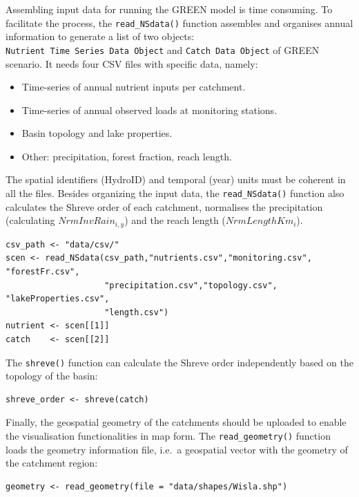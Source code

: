 Assembling input data for running the GREEN model is time consuming. To facilitate the process, the \texttt{read\_NSdata()} function assembles and organises annual information to generate a list of two objects: \texttt{Nutrient\ Time\ Series\ Data\ Object} and \texttt{Catch\ Data\ Object} of GREEN scenario. It needs four CSV files with specific data, namely:

\begin{itemize}
\item
  Time-series of annual nutrient inputs per catchment.
\item
  Time-series of annual observed loads at monitoring stations.
\item
  Basin topology and lake properties.
\item
  Other: precipitation, forest fraction, reach length.
\end{itemize}

\noindent The spatial identifiers (HydroID) and temporal (year) units must be coherent in all the files. Besides organizing the input data, the \texttt{read\_NSdata()} function also calculates the Shreve order of each catchment, normalises the precipitation (calculating \(NrmInvRain_{i,y}\)) and the reach length (\(NrmLengthKm_i\)).

\begin{verbatim}
csv_path <- "data/csv/"
scen <- read_NSdata(csv_path,"nutrients.csv","monitoring.csv", "forestFr.csv",
                    "precipitation.csv","topology.csv", "lakeProperties.csv",
                    "length.csv")
nutrient <- scen[[1]]
catch    <- scen[[2]]
\end{verbatim}

\noindent The \texttt{shreve()} function can calculate the Shreve order independently based on the topology of the basin:

\begin{verbatim}
shreve_order <- shreve(catch) 
\end{verbatim}

\noindent Finally, the geospatial geometry of the catchments should be uploaded to enable the visualisation functionalities in map form. The \texttt{read\_geometry()} function loads the geometry information file, i.e.~a geospatial vector with the geometry of the catchment region:

\begin{verbatim}
geometry <- read_geometry(file = "data/shapes/Wisla.shp")
\end{verbatim}

